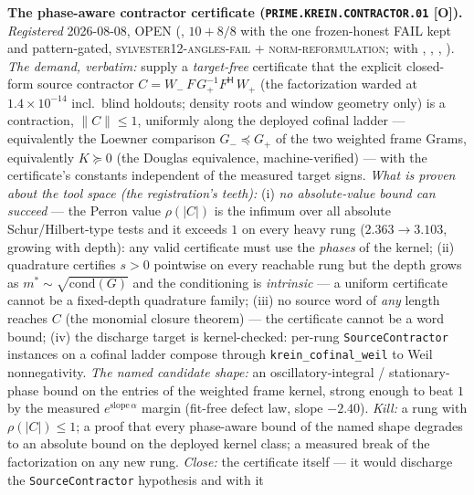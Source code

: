 \documentclass[11pt,a4paper]{article}
\begin{document}
\par\smallskip\noindent\textbf{The phase-aware contractor
certificate (\texttt{PRIME.KREIN.\allowbreak CONTRACTOR.01}
[O]).}
{\sloppy
\emph{Registered} 2026-08-08, OPEN
(, $10 + 8/8$ with
the one frozen-honest FAIL kept and pattern-gated,
\textsc{sylvester12-angles-fail} $+$
\textsc{norm-reformulation}; with
,
,
,
).  \emph{The demand,
verbatim:} supply a \emph{target-free} certificate that the
explicit closed-form source contractor
$C = W_-\,F\,G_+^{-1}F^{\mathsf H}\,W_+$ (the factorization
warded at $1.4\times10^{-14}$ incl.\ blind holdouts; density
roots and window geometry only) is a contraction, $\|C\| \le
1$, uniformly along the deployed cofinal ladder ---
equivalently the Loewner comparison $G_- \preceq G_+$ of the
two weighted frame Grams, equivalently $K \succeq 0$ (the
Douglas equivalence, machine-verified) --- with the
certificate's constants independent of the measured target
signs.  \emph{What is proven about the tool space (the
registration's teeth):} (i) \emph{no absolute-value bound can
succeed} --- the Perron value $\rho(|C|)$ is the infimum over
all absolute Schur/Hilbert-type tests and it exceeds $1$ on
every heavy rung ($2.363 \to 3.103$, growing with depth): any
valid certificate must use the \emph{phases} of the kernel;
(ii) quadrature certifies $s > 0$ pointwise on every reachable
rung but the depth grows as $m^* \sim \sqrt{\mathrm{cond}(G)}$
and the conditioning is \emph{intrinsic} --- a uniform
certificate cannot be a fixed-depth quadrature family; (iii) no
source word of \emph{any} length reaches $C$ (the monomial
closure theorem) --- the certificate cannot be a word bound;
(iv) the discharge target is kernel-checked: per-rung
\texttt{SourceContractor} instances on a cofinal ladder compose
through \texttt{krein\_cofinal\_weil} to Weil nonnegativity.
\emph{The named candidate shape:} an oscillatory-integral /
stationary-phase bound on the entries of the weighted frame
kernel, strong enough to beat $1$ by the measured
$e^{\mathrm{slope}\,\alpha}$ margin (fit-free defect law, slope
$-2.40$).  \emph{Kill:} a rung with $\rho(|C|) \le 1$; a proof
that every phase-aware bound of the named shape degrades to an
absolute bound on the deployed kernel class; a measured break
of the factorization on any new rung.  \emph{Close:} the
certificate itself --- it would discharge the
\texttt{SourceContractor} hypothesis and with it
}
\end{document}

